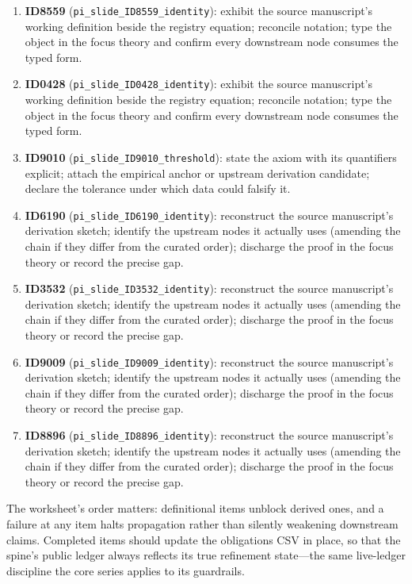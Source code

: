 \documentclass[11pt]{article}
\theoremstyle{remark}
\begin{document}
\begin{enumerate}
\item \textbf{ID8559} (\texttt{pi\_slide\_ID8559\_identity}): exhibit the source manuscript's working definition beside the registry equation; reconcile notation; type the object in the focus theory and confirm every downstream node consumes the typed form.
\item \textbf{ID0428} (\texttt{pi\_slide\_ID0428\_identity}): exhibit the source manuscript's working definition beside the registry equation; reconcile notation; type the object in the focus theory and confirm every downstream node consumes the typed form.
\item \textbf{ID9010} (\texttt{pi\_slide\_ID9010\_threshold}): state the axiom with its quantifiers explicit; attach the empirical anchor or upstream derivation candidate; declare the tolerance under which data could falsify it.
\item \textbf{ID6190} (\texttt{pi\_slide\_ID6190\_identity}): reconstruct the source manuscript's derivation sketch; identify the upstream nodes it actually uses (amending the chain if they differ from the curated order); discharge the proof in the focus theory or record the precise gap.
\item \textbf{ID3532} (\texttt{pi\_slide\_ID3532\_identity}): reconstruct the source manuscript's derivation sketch; identify the upstream nodes it actually uses (amending the chain if they differ from the curated order); discharge the proof in the focus theory or record the precise gap.
\item \textbf{ID9009} (\texttt{pi\_slide\_ID9009\_identity}): reconstruct the source manuscript's derivation sketch; identify the upstream nodes it actually uses (amending the chain if they differ from the curated order); discharge the proof in the focus theory or record the precise gap.
\item \textbf{ID8896} (\texttt{pi\_slide\_ID8896\_identity}): reconstruct the source manuscript's derivation sketch; identify the upstream nodes it actually uses (amending the chain if they differ from the curated order); discharge the proof in the focus theory or record the precise gap.
\end{enumerate}

The worksheet's order matters: definitional items unblock derived ones, and a failure at any item halts propagation rather than silently weakening downstream claims. Completed items should update the obligations CSV in place, so that the spine's public ledger always reflects its true refinement state---the same live-ledger discipline the core series applies to its guardrails.
\end{document}
